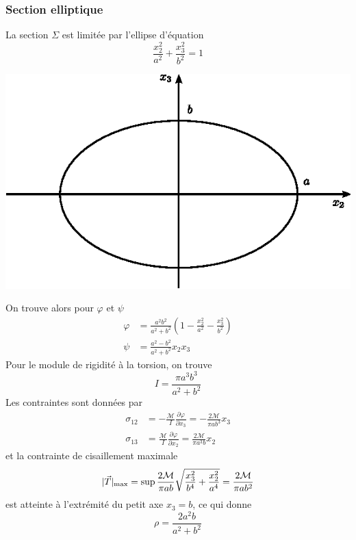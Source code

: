 \subsubsection{Section elliptique}
\begin{multicols}{2}
    La section $\Sigma$ est limitée par l'ellipse d'équation
    \begin{equation}
        \frac{x_2^2}{a^2} + \frac{x_3^2}{b^2} = 1
        \label{eq:Ch07-081}
    \end{equation}
    \columnbreak
    \begin{center}
        \includegraphics{../images/T1_Ch07-16}
    \end{center}
\end{multicols}
On trouve alors pour $\varphi$ et $\psi$
\begin{align}
    \varphi &= \frac{a^2 b^2}{a^2 + b^2} \left( 1 - \frac{x_2^2}{a^2} - \frac{x_3^2}{b^2} \right) \label{eq:Ch07-082}\\
    \psi &= \frac{a^2 - b^2}{a^2 + b^2} x_2 x_3 \label{eq:Ch07-083}
\end{align}
Pour le module de rigidité à la torsion, on trouve
\begin{equation}
    I = \frac{\pi a^3 b^3}{a^2 + b^2}
    \label{eq:Ch07-084}
\end{equation}
Les contraintes sont données par
\begin{equation}
    \begin{aligned}
        \sigma_{12} &= - \frac{\mathcal{M}}{I} \frac{\partial \varphi}{\partial x_3} = - \frac{2 \mathcal{M}}{\pi a b^3} x_3 \\
        \sigma_{13} &= \frac{\mathcal{M}}{I}\frac{\partial \varphi}{\partial x_2} = \frac{2 \mathcal{M}}{\pi a^3 b} x_2
    \end{aligned}
    \label{eq:Ch07-085}
\end{equation}
et la contrainte de cisaillement maximale
\begin{equation}
    \lvert\vec{T}\rvert_{\text{max}} = \sup \frac{2\mathcal{M}}{\pi a b} \sqrt{\frac{x_3^2}{b^4} + \frac{x_2^2}{a^4}} = \frac{2\mathcal{M}}{\pi a b^2}
    \label{eq:Ch07-086}
\end{equation}
est atteinte à l'extrémité du petit axe $x_3 = b$, ce qui donne 
\begin{equation}
    \rho = \frac{2 a^2 b}{a^2 + b^2}
    \label{eq:Ch07-087}
\end{equation}
